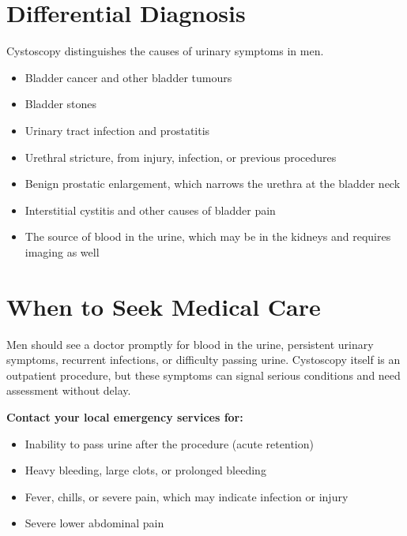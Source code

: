 \section*{Differential Diagnosis}
Cystoscopy distinguishes the causes of urinary symptoms in men.
\begin{itemize}
    \item Bladder cancer and other bladder tumours
    \item Bladder stones
    \item Urinary tract infection and prostatitis
    \item Urethral stricture, from injury, infection, or previous procedures
    \item Benign prostatic enlargement, which narrows the urethra at the bladder neck
    \item Interstitial cystitis and other causes of bladder pain
    \item The source of blood in the urine, which may be in the kidneys and requires imaging as well
\end{itemize}

\section*{When to Seek Medical Care}
Men should see a doctor promptly for blood in the urine, persistent urinary symptoms, recurrent infections, or difficulty passing urine. Cystoscopy itself is an outpatient procedure, but these symptoms can signal serious conditions and need assessment without delay.

\textbf{Contact your local emergency services for:}
\begin{itemize}
    \item Inability to pass urine after the procedure (acute retention)
    \item Heavy bleeding, large clots, or prolonged bleeding
    \item Fever, chills, or severe pain, which may indicate infection or injury
    \item Severe lower abdominal pain
\end{itemize}

